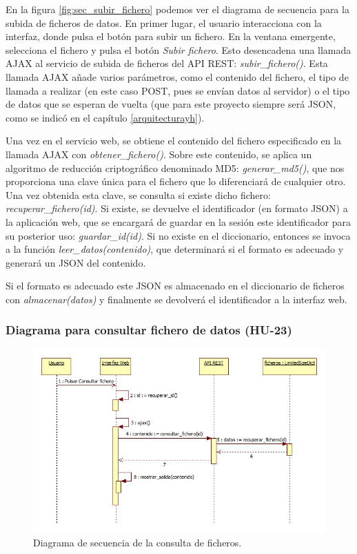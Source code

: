 En la figura \ref{fig:sec_subir_fichero} podemos ver el diagrama de secuencia para la subida de ficheros de datos. En primer lugar, el usuario interacciona con la interfaz, donde pulsa el botón para subir un fichero. En la ventana emergente, selecciona el fichero y pulsa el botón \textit{Subir fichero}. Esto desencadena una llamada AJAX al servicio de subida de ficheros del API REST: \textit{subir\_fichero()}. Esta llamada AJAX añade varios parámetros, como el contenido del fichero, el tipo de llamada a realizar (en este caso POST, pues se envían datos al servidor) o el tipo de datos que se esperan de vuelta (que para este proyecto siempre será JSON, como se indicó en el capítulo \ref{arquitecturayh}).

Una vez en el servicio web, se obtiene el contenido del fichero especificado en la llamada AJAX con \textit{obtener\_fichero()}. Sobre este contenido, se aplica un algoritmo de reducción criptográfico denominado MD5: \textit{generar\_md5()}, que nos proporciona una clave única para el fichero que lo diferenciará de cualquier otro. Una vez obtenida esta clave, se consulta si existe dicho fichero: \textit{recuperar\_fichero(id)}. Si existe, se devuelve el identificador (en formato JSON) a la aplicación web, que se encargará de guardar en la sesión este identificador para su posterior uso: \textit{guardar\_id(id)}. Si no existe en el diccionario, entonces se invoca a la función \textit{leer\_datos(contenido)}, que determinará si el formato es adecuado y generará un JSON del contenido.

Si el formato es adecuado este JSON es almacenado en el diccionario de ficheros con \textit{almacenar(datos)} y finalmente se devolverá el identificador a la interfaz web.

\subsubsection{Diagrama para consultar fichero de datos (HU-23)}

\begin{figure}[H]
\centering
\includegraphics[scale=0.5]{figuras/sec_consultar_fichero.jpg}
\caption{Diagrama de secuencia de la consulta de ficheros.}
\label{fig:sec_consultar_fichero}
\end{figure}

